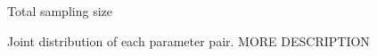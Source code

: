 \begin{figure}[H]

    \begin{center}
    \end{center}

    \caption{Total sampling size}
    \label{fig:resultCurve_uni}


\end{figure}

\begin{figure}[ht]
    \begin{center}
    \end{center}
    \caption[Joint density distribution of each parameter pair]%
    {Joint distribution of each parameter pair. MORE DESCRIPTION}
    \label{fig:model5_para_joint}
\end{figure}






